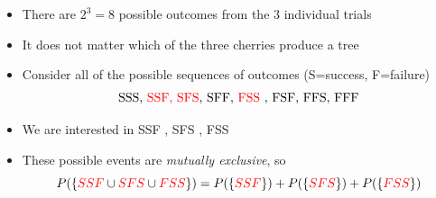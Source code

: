 \documentclass[smaller]{beamer}\usepackage[]{graphicx}\usepackage[]{color}
\renewcommand{\Pr}{P}
\newenvironment{stepitemize}{\begin{itemize}[<+->]}{\end{itemize} }
\begin{document}
\begin{frame}{\secname}%


\begin{example}[continued]
\begin{footnotesize}
\begin{stepitemize}
\item There are $2^{3}=8$ possible outcomes from the $3$ individual trials

\item It does not matter which of the three cherries produce a tree

\item Consider all of the possible sequences of outcomes (S=success,
F=failure)%
\begin{equation*}
\text{SSS,
\color{red}%
SSF,
\color{black}%
\color{red}%
SFS%
\color{black}%
, SFF,
\color{red}%
FSS
\color{black}, FSF, FFS, FFF}
\end{equation*}

\item We are interested in
\color{red}%
SSF%
\color{black}%
,
\color{red}%
SFS%
\color{black}%
,
\color{red}%
FSS%
\color{black}%

\item These possible events are \emph{mutually exclusive}, so%
\begin{equation*}
\Pr (\left\{
\color{red}%
SSF%
\color{black}%
\cup
\color{red}%
SFS%
\color{black}%
\cup
\color{red}%
FSS%
\color{black}%
\right\}) =\Pr (\left\{
\color{red}%
SSF%
\color{black}%
\right\}) +\Pr (\left\{
\color{red}%
SFS%
\color{black}%
\right\}) +\Pr (\left\{
\color{red}%
FSS%
\color{black}%
\right\})
\end{equation*}
\end{stepitemize}
\end{footnotesize}
\end{example}
\end{frame}%
\end{document}
